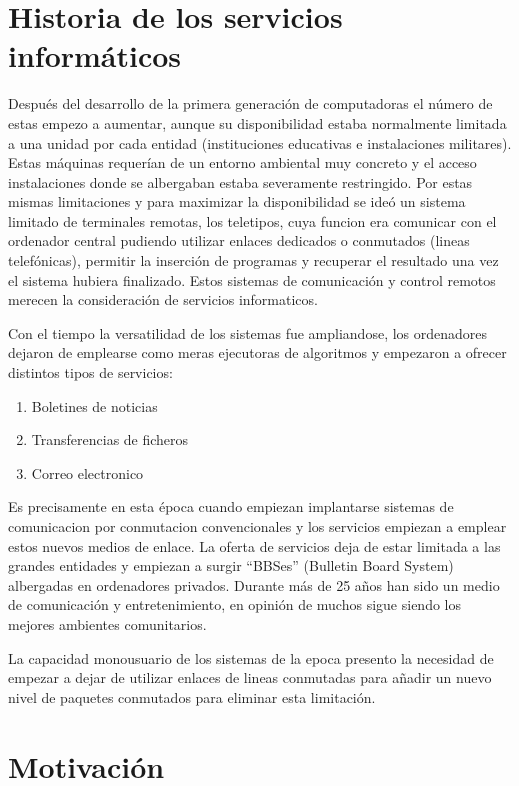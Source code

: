 \documentclass[a4paper,spanish,12pt]{book}
\begin{document}
\section{Historia de los servicios informáticos}
Despu\'es del desarrollo de la primera generación de computadoras el número de estas empezo a aumentar, aunque su disponibilidad estaba normalmente limitada a una unidad por cada entidad (instituciones educativas e instalaciones militares). Estas máquinas requerían de un entorno ambiental muy concreto y el acceso instalaciones donde se albergaban estaba severamente restringido. Por estas mismas limitaciones y para maximizar la disponibilidad se ideó un sistema limitado de terminales remotas, los teletipos, cuya funcion era comunicar con el ordenador central pudiendo utilizar enlaces dedicados o conmutados (lineas telefónicas), permitir la inserción de programas y recuperar el resultado una vez el sistema hubiera finalizado. Estos sistemas de comunicación y control remotos merecen la consideración de servicios informaticos.

Con el tiempo la versatilidad de los sistemas fue ampliandose, los ordenadores dejaron de emplearse como meras ejecutoras de algoritmos y empezaron a ofrecer distintos tipos de servicios:
\begin{enumerate}
	\item Boletines de noticias
	\item Transferencias de ficheros
	\item Correo electronico
\end{enumerate}
Es precisamente en esta \'epoca cuando empiezan implantarse sistemas de comunicacion por conmutacion convencionales y los servicios empiezan a emplear estos nuevos medios de enlace. La oferta de servicios deja de estar limitada a las grandes entidades y empiezan a surgir ``BBSes'' (Bulletin Board System) albergadas en ordenadores privados. Durante más de 25 años han sido un medio de comunicación y entretenimiento, en opinión de muchos sigue siendo los mejores ambientes comunitarios. 

La capacidad monousuario de los sistemas de la epoca presento la necesidad de empezar a dejar de utilizar enlaces de lineas conmutadas para añadir un nuevo nivel de paquetes conmutados para eliminar esta limitación.

\section{Motivación}
\end{document}
